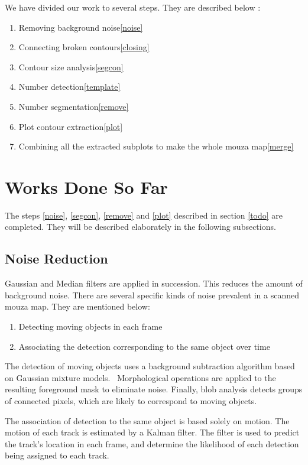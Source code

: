 We have divided our work to several steps. They are described below : 

\begin{enumerate}
    \item Removing background noise\ref{noise}
    \item Connecting broken contours\ref{closing}
    \item Contour size analysis\ref{segcon}
    \item Number detection\ref{template}
    \item Number segmentation\ref{remove}
    \item Plot contour extraction\ref{plot}
    \item Combining all the extracted subplots to make the whole mouza map\ref{merge}
\end{enumerate}


\section{Works Done So Far}

The steps \ref{noise}, \ref{segcon}, \ref{remove} and \ref{plot} described in section \ref{todo} are completed. They will be described elaborately in the following subsections.

\subsection{Noise Reduction}
Gaussian and Median filters are applied in succession. This reduces the amount of background noise. There are several specific kinds of noise prevalent in a scanned mouza map. They are mentioned below:
\begin{enumerate}
    \item Detecting moving objects in each frame
    \item Associating the detection corresponding to the same object over time
\end{enumerate}

The detection of moving objects uses a background subtraction algorithm based on Gaussian mixture models.~\cite{DBLP:conf/cvpr/StaufferG99} Morphological operations are applied to the resulting foreground mask to eliminate noise. Finally, blob analysis detects groups of connected pixels, which are likely to correspond to moving objects.

The association of detection to the same object is based solely on motion. The motion of each track is estimated by a Kalman filter. The filter is used to predict the track's location in each frame, and determine the likelihood of each detection being assigned to each track.

